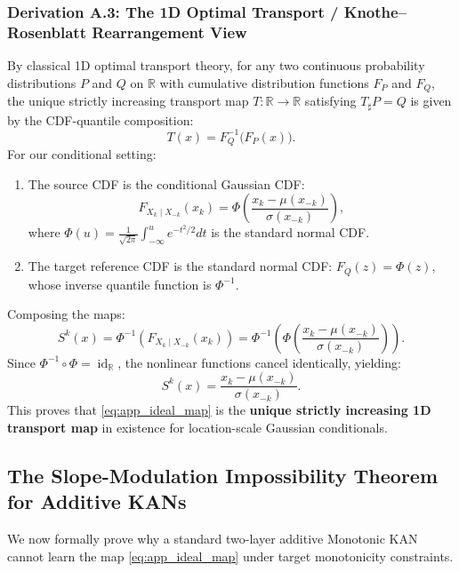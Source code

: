 \documentclass[11pt,a4paper]{article}
\theoremstyle{plain}
\theoremstyle{definition}
\theoremstyle{remark}
\begin{document}
\subsubsection{Derivation A.3: The 1D Optimal Transport / Knothe--Rosenblatt Rearrangement View}
By classical 1D optimal transport theory, for any two continuous probability distributions $P$ and $Q$ on $\mathbb{R}$ with cumulative distribution functions $F_P$ and $F_Q$, the unique strictly increasing transport map $T: \mathbb{R} \to \mathbb{R}$ satisfying $T_\sharp P = Q$ is given by the CDF-quantile composition:
\begin{equation}
    T(x) = F_Q^{-1}\Big( F_P(x) \Big).
\end{equation}
For our conditional setting:
\begin{enumerate}
    \item The source CDF is the conditional Gaussian CDF:
    \begin{equation}
        F_{X_k \mid X_{-k}}(x_k) = \Phi\left( \frac{x_k - \mu(x_{-k})}{\sigma(x_{-k})} \right),
    \end{equation}
    where $\Phi(u) = \frac{1}{\sqrt{2\pi}} \int_{-\infty}^u e^{-t^2/2} dt$ is the standard normal CDF.
    \item The target reference CDF is the standard normal CDF: $F_Q(z) = \Phi(z)$, whose inverse quantile function is $\Phi^{-1}$.
\end{enumerate}
Composing the maps:
\begin{equation}
    S^k(x) = \Phi^{-1}\left( F_{X_k \mid X_{-k}}(x_k) \right) = \Phi^{-1}\left( \Phi\left( \frac{x_k - \mu(x_{-k})}{\sigma(x_{-k})} \right) \right).
\end{equation}
Since $\Phi^{-1} \circ \Phi = \operatorname{id}_\mathbb{R}$, the nonlinear functions cancel identically, yielding:
\begin{equation}
    S^k(x) = \frac{x_k - \mu(x_{-k})}{\sigma(x_{-k})}.
\end{equation}
This proves that \eqref{eq:app_ideal_map} is the \textbf{unique strictly increasing 1D transport map} in existence for location-scale Gaussian conditionals.

\subsection{The Slope-Modulation Impossibility Theorem for Additive KANs}

We now formally prove why a standard two-layer additive Monotonic KAN cannot learn the map \eqref{eq:app_ideal_map} under target monotonicity constraints.
\end{document}
